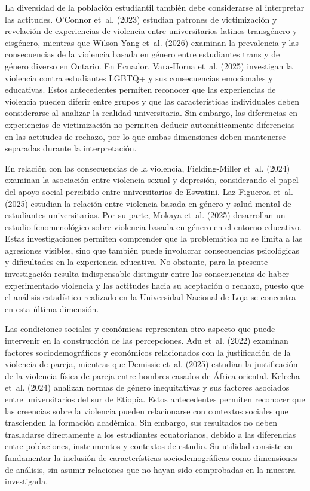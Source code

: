 \documentclass[
  spanish,
  11pt,
  letterpaper,
  DIV=11,
  numbers=noendperiod]{scrreprt}
\begin{document}
La diversidad de la población estudiantil también debe considerarse al
interpretar las actitudes. O'Connor et~al. (2023) estudian patrones de
victimización y revelación de experiencias de violencia entre
universitarios latinos transgénero y cisgénero, mientras que Wilson-Yang
et~al. (2026) examinan la prevalencia y las consecuencias de la
violencia basada en género entre estudiantes trans y de género diverso
en Ontario. En Ecuador, Vara-Horna et~al. (2025) investigan la violencia
contra estudiantes LGBTQ+ y sus consecuencias emocionales y educativas.
Estos antecedentes permiten reconocer que las experiencias de violencia
pueden diferir entre grupos y que las características individuales deben
considerarse al analizar la realidad universitaria. Sin embargo, las
diferencias en experiencias de victimización no permiten deducir
automáticamente diferencias en las actitudes de rechazo, por lo que
ambas dimensiones deben mantenerse separadas durante la interpretación.

En relación con las consecuencias de la violencia, Fielding-Miller
et~al. (2024) examinan la asociación entre violencia sexual y depresión,
considerando el papel del apoyo social percibido entre universitarias de
Eswatini. Laz-Figueroa et~al. (2025) estudian la relación entre
violencia basada en género y salud mental de estudiantes universitarias.
Por su parte, Mokaya et~al. (2025) desarrollan un estudio fenomenológico
sobre violencia basada en género en el entorno educativo. Estas
investigaciones permiten comprender que la problemática no se limita a
las agresiones visibles, sino que también puede involucrar consecuencias
psicológicas y dificultades en la experiencia educativa. No obstante,
para la presente investigación resulta indispensable distinguir entre
las consecuencias de haber experimentado violencia y las actitudes hacia
su aceptación o rechazo, puesto que el análisis estadístico realizado en
la Universidad Nacional de Loja se concentra en esta última dimensión.

Las condiciones sociales y económicas representan otro aspecto que puede
intervenir en la construcción de las percepciones. Adu et~al. (2022)
examinan factores sociodemográficos y económicos relacionados con la
justificación de la violencia de pareja, mientras que Demissie et~al.
(2025) estudian la justificación de la violencia física de pareja entre
hombres casados de África oriental. Kelecha et~al. (2024) analizan
normas de género inequitativas y sus factores asociados entre
universitarios del sur de Etiopía. Estos antecedentes permiten reconocer
que las creencias sobre la violencia pueden relacionarse con contextos
sociales que trascienden la formación académica. Sin embargo, sus
resultados no deben trasladarse directamente a los estudiantes
ecuatorianos, debido a las diferencias entre poblaciones, instrumentos y
contextos de estudio. Su utilidad consiste en fundamentar la inclusión
de características sociodemográficas como dimensiones de análisis, sin
asumir relaciones que no hayan sido comprobadas en la muestra
investigada.
\end{document}
